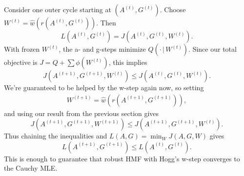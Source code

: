 \documentclass[onecolumn,floatfix]{aastex631}
\begin{document}
Consider one outer cycle starting at $(A^{(t)}, G^{(t)})$.
Choose $W^{(t)} = \hat{w}(r(A^{(t)},G^{(t)}))$.
Then
\begin{equation}
    L(A^{(t)}, G^{(t)}) = J(A^{(t)}, G^{(t)}, W^{(t)}).
\end{equation}
With frozen $W^{(t)}$, the a- and g-steps minimize $Q(\cdot \,| \,W^{(t)})$.
Since our total objective is $J = Q + \sum \phi(W^{(t)})$, this implies
\begin{equation}
    J(A^{(t+1)}, G^{(t+1)}, W^{(t)}) \le J(A^{(t)}, G^{(t)}, W^{(t)}).
\end{equation}
We're guaranteed to be helped by the w-step again now, so setting
\begin{align}
    W^{(t+1)} = \hat{w} \left( r(A^{(t+1)}, G^{(t+1)}) \right),
\end{align}
and using our result from the previous section gives
\begin{equation}
    J(A^{(t+1)}, G^{(t+1)}, W^{(t+1)}) \le J(A^{(t+1)}, G^{(t+1)}, W^{(t)}).
\end{equation}
Thus chaining the inequalities and $L(A,G) = \min_W J(A, G, W)$ gives
\begin{equation}
    L(A^{(t+1)}, G^{(t+1)}) \le L(A^{(t)}, G^{(t)}).
\end{equation}
This is enough to guarantee that robust HMF with Hogg's w-step converges to the Cauchy MLE.

\end{document}
